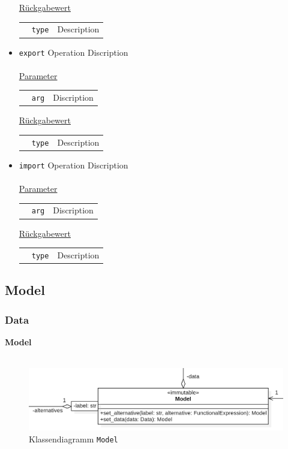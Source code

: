 \documentclass{article}
\begin{document}
\begin{itemize}
\underline{{Rückgabewert}}
\begin{tabular}{lll}
 & \texttt{type} & Description\\
\end{tabular}
\item \texttt{export} \newline Operation Discription
\\\\

\underline{{Parameter}} 
\begin{tabular}{lll}
 & \texttt{arg} & Discription \\
\end{tabular}

\underline{{Rückgabewert}}
\begin{tabular}{lll}
 & \texttt{type} & Description\\
\end{tabular}
\item \texttt{import} \newline Operation Discription
\\\\

\underline{{Parameter}} 
\begin{tabular}{lll}
 & \texttt{arg} & Discription \\
\end{tabular}

\underline{{Rückgabewert}}
\begin{tabular}{lll}
 & \texttt{type} & Description\\
\end{tabular}
\end{itemize}



\newpage
\subsection{Model}
\subsubsection{Data}
\textbf{\large{Model}}\\\\
\begin{figure}[H]%
    \centering
    \includegraphics[width=13cm]{entwurf/Entwurf_dokument/img/cls/model/Model.png}
    \caption{Klassendiagramm \texttt{Model}}
\end{figure}
\end{document}
